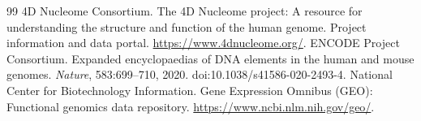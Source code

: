 \documentclass[11pt,a4paper]{article}
\theoremstyle{definition}
\theoremstyle{remark}
\begin{document}
\begin{thebibliography}{99}
 4D Nucleome Consortium. The 4D Nucleome project: A resource for understanding the structure and function of the human genome. Project information and data portal. \url{https://www.4dnucleome.org/}.
 ENCODE Project Consortium. Expanded encyclopaedias of DNA elements in the human and mouse genomes. \emph{Nature}, 583:699--710, 2020. doi:10.1038/s41586-020-2493-4.
 National Center for Biotechnology Information. Gene Expression Omnibus (GEO): Functional genomics data repository. \url{https://www.ncbi.nlm.nih.gov/geo/}.
\end{thebibliography}
\end{document}

